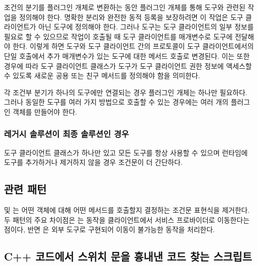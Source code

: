 \documentclass[a4paper,10pt,twoside]{book}
\begin{document}
\begin{bulletlist}
\item 조건의 분기를 플러그인 개체로 변환하는 동안 플러그인 개체를 통해 도구와 관련된 작업을 정의해야 한다. 명확한 분리와 완전한 동적 등록을 보장하려면 이 작업은 도구 클라이언트가 아닌 도구에 정의해야 한다. 그러나 도구는 도구 클라이언트의 일부 정보를 필요로 할 수 있으므로 작업이 호출될 때 도구 클라이언트를 매개변수로 도구에 전달해야 한다. 이렇게 하면 도구와 도구 클라이언트 간의 프로토콜이 도구 클라이언트에서의 단일 호출에서 추가 매개변수가 있는 도구에 대한 메서드 호출로 변경된다. 이는 또한 경우에 따라 도구 클라이언트 클래스가 도구가 도구 클라이언트 권한 정보에 액세스할 수 있도록 새로운 공용 또는 친구 메서드를 정의해야 함을 의미한다. 

\item 각 조건부 분기가 하나의 도구에만 연결되는 경우 플러그인 개체는 하나만 필요하다. 그러나 동일한 도구를 여러 가지 방법으로 호출할 수 있는 경우에는 여러 개의 플러그인 객체를 만들어야 한다.
\end{bulletlist}

\subsubsection*{레거시 솔루션이 최종 솔루션인 경우}

\begin{bulletlist}
\item 도구 클라이언트 클래스가 하나만 있고 모든 도구를 항상 사용할 수 있으며 런타임에 도구를 추가하거나 제거하지 않을 경우 조건문이 더 간단하다.
\end{bulletlist}

\subsection*{관련 패턴}

 및 는 어떤 객체에 대해 어떤 메서드를 호출할지 결정하는 조건문 표현식을 제거한다. 두 패턴의 주요 차이점은 는 동작을 클라이언트에서 서비스 프로바이더로 이동한다는 점이다, 반면 은 외부 도구로 구현되어 이동이 불가능한 동작을 처리한다.

\subsection*{C++ 코드에서 스위치 문을 흉내낸 코드 찾는 스크립트}
\end{document}
